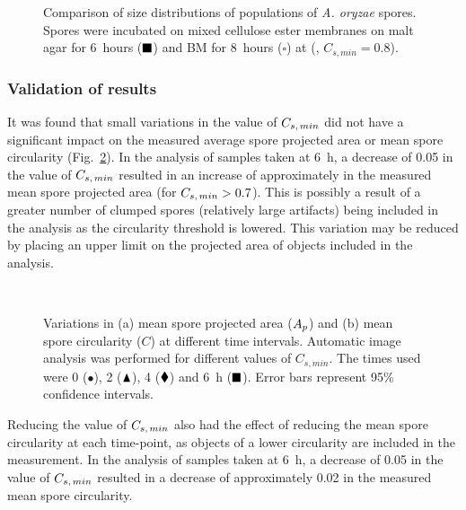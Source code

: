 \begin{figure}[htbp]
	\centering
	\caption{Comparison of size distributions of populations of \emph{A. oryzae} spores. Spores were incubated on mixed cellulose ester membranes on malt agar for 6~hours ($\blacksquare$) and BM for 8~hours ($\square$) at  (, $C_{s,min} = 0.8$).}
	\label{fig:MA6hvTAg8h}
\end{figure}

\subsubsection{Validation of results}

It was found that small variations in the value of $C_{s,\,min}$ did not have a significant impact on the measured average spore projected area or mean spore circularity (Fig.~\ref{fig:ApsCsCsmin}). In the analysis of samples taken at 6~h, a decrease of 0.05 in the value of $C_{s,\,min}$ resulted in an increase of approximately  in the measured mean spore projected area (for $C_{s,\,min} > 0.7$). This is possibly a result of a greater number of clumped spores (relatively large artifacts) being included in the analysis as the circularity threshold is lowered. This variation may be reduced by placing an upper limit on the projected area of objects included in the analysis.

\begin{figure}[htbp]
	\centering
	\captionsetup[subfloat]{position=top}
	\\
  \caption{Variations in (a) mean spore projected area ($A_p$) and (b) mean spore circularity ($C$) at different time intervals. Automatic image analysis was performed for different values of $C_{s,min}$. The times used were 0 ($\bullet$), 2 ($\blacktriangle$), 4 ($\blacklozenge$) and 6~h ($\blacksquare$). Error bars represent 95\% confidence intervals.}
  \label{fig:ApsCsCsmin}
\end{figure}

Reducing the value of $C_{s,\,min}$ also had the effect of reducing the mean spore circularity at each time-point, as objects of a lower circularity are included in the measurement. In the analysis of samples taken at 6~h, a decrease of 0.05 in the value of $C_{s,\,min}$ resulted in a decrease of approximately 0.02 in the measured mean spore circularity.

